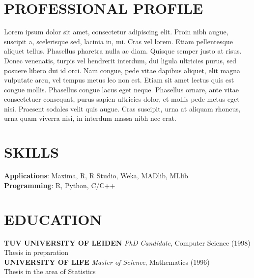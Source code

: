 \documentclass[a4paper, line, 11pt]{res} %
\begin{document}
 
 
\address{Applicant Address with Street, City, Zip Code\\Tel: +48 999 000
666}        
\address{E-mail: \href{mailto:e.mail@e.mail}{\nolinkurl{e.mail@e.mail}}\\ URL: \url{https://mysite.com}}
  
                        
\begin{resume}                         
 
\section{PROFESSIONAL PROFILE}  
  Lorem ipsum dolor sit amet, consectetur adipiscing elit. Proin nibh
augue, suscipit a, scelerisque sed, lacinia in, mi. Cras vel lorem.
Etiam pellentesque aliquet tellus. Phasellus pharetra nulla ac diam.
Quisque semper justo at risus. Donec venenatis, turpis vel hendrerit
interdum, dui ligula ultricies purus, sed posuere libero dui id orci.
Nam congue, pede vitae dapibus aliquet, elit magna vulputate arcu, vel
tempus metus leo non est. Etiam sit amet lectus quis est congue mollis.
Phasellus congue lacus eget neque. Phasellus ornare, ante vitae
consectetuer consequat, purus sapien ultricies dolor, et mollis pede
metus eget nisi. Praesent sodales velit quis augue. Cras suscipit, urna
at aliquam rhoncus, urna quam viverra nisi, in interdum massa nibh nec
erat. 

\section{SKILLS}  

    \textbf{Applications}: Maxima, R, R Studio, Weka, MADlib, MLlib\\
    \textbf{Programming}: R, Python, C/C++

\section{EDUCATION} 

    \textbf{\uppercase{TUV University of Leiden}} \emph{PhD
Candidate}, Computer Science (1998)\\ Thesis in preparation \\
    \textbf{\uppercase{University of life}} \emph{Master of
Science}, Mathematics (1996)\\ Thesis in the area of Statistics 

  

\end{resume}
\end{document}
